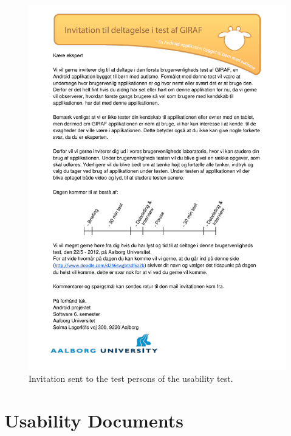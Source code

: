 \begin{figure}%
	\begin{center}
	\includegraphics[width=\textwidth]{Appendix/invitation_to_usability_test.pdf}
	\end{center}
\caption{Invitation sent to the test persons of the usability test.}
\label{fig:usability_test_invitation}
\end{figure}




\section{Usability Documents}
\label{app:usability_documents}

